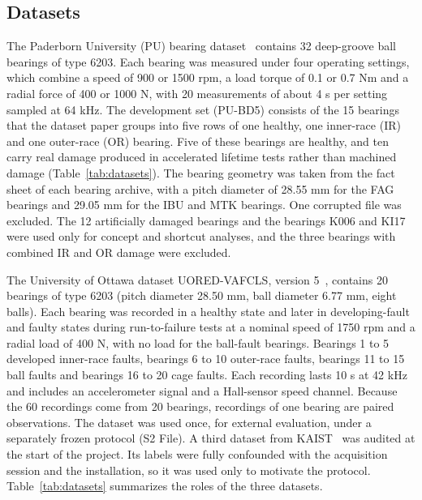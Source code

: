 \documentclass[10pt,letterpaper]{article}
\begin{document}
\subsection*{Datasets}
The Paderborn University (PU) bearing dataset~\cite{lessmeier2016condition,paderborn2016KAtData} contains 32 deep-groove ball bearings of type 6203. Each bearing was measured under four operating settings, which combine a speed of 900 or 1500 rpm, a load torque of 0.1 or 0.7 Nm and a radial force of 400 or 1000 N, with 20 measurements of about 4 s per setting sampled at 64 kHz. The development set (PU-BD5) consists of the 15 bearings that the dataset paper groups into five rows of one healthy, one inner-race (IR) and one outer-race (OR) bearing. Five of these bearings are healthy, and ten carry real damage produced in accelerated lifetime tests rather than machined damage (Table~\ref{tab:datasets}). The bearing geometry was taken from the fact sheet of each bearing archive, with a pitch diameter of 28.55 mm for the FAG bearings and 29.05 mm for the IBU and MTK bearings. One corrupted file was excluded. The 12 artificially damaged bearings and the bearings K006 and KI17 were used only for concept and shortcut analyses, and the three bearings with combined IR and OR damage were excluded.

The University of Ottawa dataset UORED-VAFCLS, version 5~\cite{sehri2023university,sehri2023uoredData}, contains 20 bearings of type 6203 (pitch diameter 28.50 mm, ball diameter 6.77 mm, eight balls). Each bearing was recorded in a healthy state and later in developing-fault and faulty states during run-to-failure tests at a nominal speed of 1750 rpm and a radial load of 400 N, with no load for the ball-fault bearings. Bearings 1 to 5 developed inner-race faults, bearings 6 to 10 outer-race faults, bearings 11 to 15 ball faults and bearings 16 to 20 cage faults. Each recording lasts 10 s at 42 kHz and includes an accelerometer signal and a Hall-sensor speed channel. Because the 60 recordings come from 20 bearings, recordings of one bearing are paired observations. The dataset was used once, for external evaluation, under a separately frozen protocol (S2 File). A third dataset from KAIST~\cite{jung2023vibration,jung2023kaistData} was audited at the start of the project. Its labels were fully confounded with the acquisition session and the installation, so it was used only to motivate the protocol. Table~\ref{tab:datasets} summarizes the roles of the three datasets.
\end{document}
